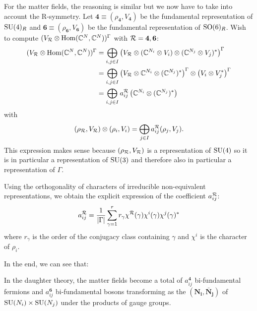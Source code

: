         For the matter fields, the reasoning is similar but we now have to take into account the R-symmetry. Let $\boldsymbol{4}\equiv(\rho_{\boldsymbol{4}},V_{\boldsymbol{4}})$ be the fundamental representation of $\text{SU}(4)_R$ and $\boldsymbol{6}\equiv(\rho_{\boldsymbol{6}},V_{\boldsymbol{6}})$ be the fundamental representation of $\text{SO}(6)_R$. Wish to compute $(V_{\mathcal{R}}\otimes\text{Hom}(\mathbb{C}^N,\mathbb{C}^N))^\Gamma$ with $\mathcal{R}=\boldsymbol{4},\boldsymbol{6}$:
        \begin{align}
            (V_{\mathcal{R}}\otimes\text{Hom}(\mathbb{C}^N,\mathbb{C}^N))^\Gamma &= \bigoplus_{i,j\in I} \left(V_{\mathcal{R}}\otimes (\mathbb{C}^{N_i}\otimes V_i)\otimes(\mathbb{C}^{N_j}\otimes V_j)^*\right)^\Gamma\\
            &= \bigoplus_{i,j\in I} \left(V_{\mathcal{R}}\otimes\mathbb{C}^{N_i}\otimes(\mathbb{C}^{N_j})^*\right)^\Gamma\otimes\left(V_i\otimes V^*_j\right)^\Gamma\\
            &= \bigoplus_{i,j\in I}a^{\mathcal{R}}_{ij}\left(\mathbb{C}^{N_i}\otimes(\mathbb{C}^{N_j})^*\right)\label{eq:resdecomp}
        \end{align}
        with
        \begin{equation}
            (\rho_{\mathcal{R}},V_{\mathcal{R}})\otimes(\rho_i,V_i)=\bigoplus_{j\in I}a^{\mathcal{R}}_{ij}(\rho_j,V_j).\label{eq:defaij}
        \end{equation}
        This expression makes sense because $(\rho_{\mathcal{R}},V_{\mathcal{R}})$ is a representation of $\text{SU}(4)$ so it is in particular a representation of $\text{SU}(3)$ and therefore also in particular a representation of $\Gamma$.

        Using the orthogonality of characters of irreducible non-equivalent representations, we obtain the explicit expression of the coefficient $a^{\mathcal{R}}_{ij}$:
        \begin{equation}
            a^{\mathcal{R}}_{ij} = \frac{1}{\abs{\Gamma}}\sum^r_{\gamma=1} r_\gamma\chi^{\mathcal{R}}(\gamma)\chi^i(\gamma)\chi^j(\gamma)^*
        \end{equation}
        where $r_\gamma$ is the order of the conjugacy class containing $\gamma$ and $\chi^i$ is the character of $\rho_i$.

        In the end, we can see that:
        \begin{result}
            In the daughter theory, the matter fields become a total of $a^{\boldsymbol{4}}_{ij}$ bi-fundamental fermions and $a^{\boldsymbol{6}}_{ij}$ bi-fundamental bosons transforming as the $(\boldsymbol{\textbf{N}_i},\boldsymbol{\bar{\textbf{N}}_j})$ of $\text{SU}(N_i)\times\text{SU}(N_j)$ under the products of gauge groups.
        \end{result}

